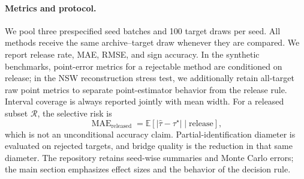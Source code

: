 \documentclass[11pt]{article}
\numberwithin{equation}{section}
\newcommand{\1}{\mathbf 1}
\newcommand{\abs}[1]{\left\lvert #1\right\rvert}
\begin{document}
\paragraph{Metrics and protocol.}
We pool three prespecified seed batches and 100 target draws per seed.  All methods receive the same archive--target draw whenever they are compared.  We report release rate, MAE, RMSE, and sign accuracy.  In the synthetic benchmarks, point-error metrics for a rejectable method are conditioned on release; in the NSW reconstruction stress test, we additionally retain all-target raw point metrics to separate point-estimator behavior from the release rule.  Interval coverage is always reported jointly with mean width.  For a released subset $\mathcal R$, the selective risk is
\[
\operatorname{MAE}_{\mathrm{released}}
 =\mathbb E\!\left[\abs{\widehat\tau-\tau^\star}\mid \text{release}\right],
\]
which is not an unconditional accuracy claim.  Partial-identification diameter is evaluated on rejected targets, and bridge quality is the reduction in that same diameter.  The repository retains seed-wise summaries and Monte Carlo errors; the main section emphasizes effect sizes and the behavior of the decision rule.
\end{document}
